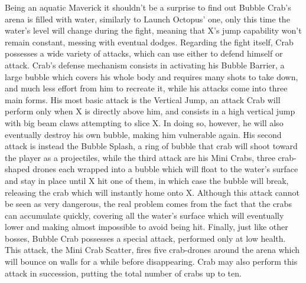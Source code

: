 Being an aquatic Maverick it shouldn't be a surprise to find out Bubble Crab's arena is filled with water, similarly to Launch Octopus' one, only this time the water's level will change during the fight, meaning that X's jump capability won't remain constant, messing with eventual dodges. Regarding the fight itself, Crab possesses a wide variety of attacks, which can use either to defend himself or attack. Crab's defense mechanism consists in activating his Bubble Barrier, a large bubble which covers his whole body and requires many shots to take down, and much less effort from him to recreate it, while his attacks come into three main forms. His most basic attack is the Vertical Jump, an attack Crab will perform only when X is directly above him, and consists in a high vertical jump with big beam claws attempting to slice X. In doing so, however, he will also eventually destroy his own bubble, making him vulnerable again. His second attack is instead the Bubble Splash, a ring of bubble that crab will shoot toward the player as a projectiles, while the third attack are his Mini Crabs,  three crab-shaped drones each wrapped into a bubble which will float to the water's surface and stay in place until X hit one of them, in which case the bubble will break, releasing the crab which will instantly home onto X. Although this attack cannot be seen as very dangerous, the real problem comes from the fact that the crabs can accumulate quickly, covering all the water's surface which will eventually lower and making almost impossible to avoid being hit. Finally, just like other bosses, Bubble Crab possesses a special attack, performed only at low health. This attack, the Mini Crab Scatter, fires five crab-drones around the arena which will bounce on walls for a while before disappearing. Crab may also perform this attack in succession, putting the total number of crabs up to ten.
